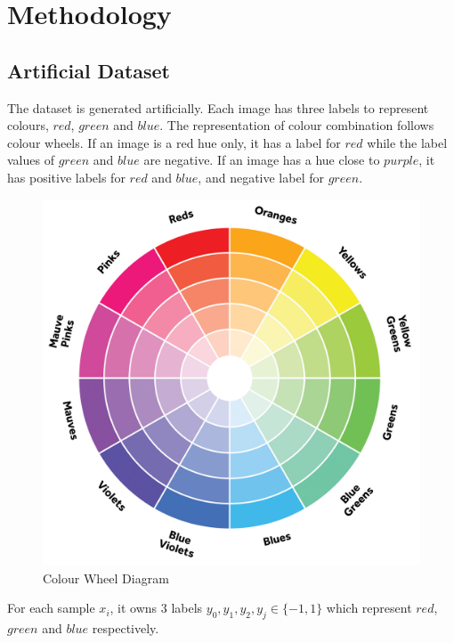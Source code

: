 
\chapter{Methodology} %
\label{Chapter7}

\section{Artificial Dataset}

The dataset is generated artificially. Each image has three labels to represent colours, $red$, $green$ and $blue$. The representation of colour combination follows colour wheels. If an image is a red hue only, it has a label for $red$ while the label values of $green$ and $blue$ are negative. If an image has a hue close to $purple$, it has positive labels for $red$ and $blue$, and negative label for $green$.
\graphicspath{ {./Figures/} }
\begin{figure}[!htb]
\centering
\includegraphics[scale=0.1]{color_wheel.jpg}
\caption{\label{fig:ColorWheel}Colour Wheel Diagram \citep{ColourWheel}}
\end{figure}

For each sample $x_{i}$, it owns 3 labels ${y_{0},y_{1},y_{2}},  y_{j} \in \{-1,1\}$ which represent $red$, $green$ and $blue$ respectively.

